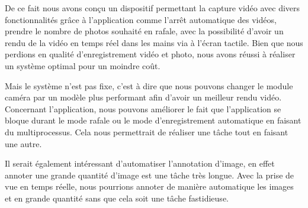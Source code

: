 

    \vspace{0.2cm}
    
    De ce fait nous avons conçu un dispositif permettant la capture vidéo avec divers fonctionnalités grâce à l'application comme l'arrêt automatique des vidéos, prendre le nombre de photos souhaité en rafale, avec la possibilité d'avoir un rendu de la vidéo en temps réel dans les mains via à l'écran tactile. Bien que nous perdions en qualité d'enregistrement vidéo et photo, nous avons réussi à réaliser un système optimal pour un moindre coût.

    \vspace{0.2cm}

    Mais le système n'est pas fixe, c'est à dire que nous pouvons changer le module caméra par un modèle plus performant afin d'avoir un meilleur rendu vidéo. Concernant l'application, nous pouvons améliorer le fait que l'application se bloque durant le mode rafale ou le mode d'enregistrement automatique en faisant du multiprocessus.
    Cela nous permettrait de réaliser une tâche tout en faisant une autre.

    \vspace{0.2cm}

    Il serait également intéressant d'automatiser l'annotation d'image, en effet annoter une grande quantité d'image est une tâche très longue. Avec la prise de vue en temps réelle, nous pourrions annoter de manière automatique les images et en grande quantité sans que cela soit une tâche fastidieuse.

    


    
